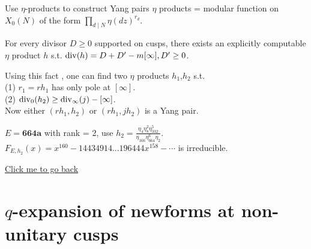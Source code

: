 \documentclass[handout]{beamer}
\begin{document}
\begin{frame}{Use $\eta$-products to construct Yang pairs}
$\eta$ products = modular function on $X_0(N)$ of the form $\prod_{d \mid N}\eta(dz)^{r_d}$.

\pause 
\begin{Fact}
For every divisor $D \geq 0$ supported on cusps, there exists an explicitly computable
$\eta$ product $h$ s.t.  $\operatorname{div}(h) = D + D' - m[\infty], D' \geq 0$. 
\end{Fact}

\pause 
Using this fact , one can find two $\eta$ products $h_1$,$h_2$ s.t. \\
(1) $r_1 = rh_1$ has only pole at $[\infty]$. \\
(2) $\operatorname{div}_0(h_2) \geq \operatorname{div}_\infty(j) -[\infty]$. \\
Now either $(rh_1,h_2)$ or $(rh_1, jh_2)$ is a Yang pair.

\pause

\begin{Example}
$E = \textbf{664a}$ with rank = 2, use $h_2 = \frac{\eta_4\eta_8^2 \eta_{332}^5}{\eta_{166}\eta_{664}^{6}{\eta_2}}$.\\
$F_{E,h_2}(x) = x^{160} - 14434914...196444x^{158} - \cdots$  is irreducible. 
\end{Example}

\hyperlink{pr: algorithm}{\small{Click me to go back}}


\end{frame}


\section{$q$-expansion of newforms at non-unitary cusps} 

\end{document}
